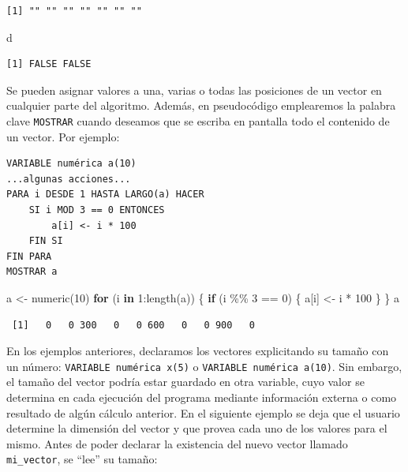 \documentclass[
]{book}
\newenvironment{Shaded}{\begin{snugshade}}{\end{snugshade}}
\newcommand{\ControlFlowTok}[1]{\textcolor[rgb]{0.13,0.29,0.53}{\textbf{#1}}}
\newcommand{\DecValTok}[1]{\textcolor[rgb]{0.00,0.00,0.81}{#1}}
\newcommand{\FunctionTok}[1]{\textcolor[rgb]{0.00,0.00,0.00}{#1}}
\newcommand{\NormalTok}[1]{#1}
\newcommand{\OtherTok}[1]{\textcolor[rgb]{0.56,0.35,0.01}{#1}}
\newcommand{\SpecialCharTok}[1]{\textcolor[rgb]{0.00,0.00,0.00}{#1}}
\begin{document}
\begin{verbatim}
[1] "" "" "" "" "" "" ""
\end{verbatim}

\begin{Shaded}
\begin{Highlighting}[]
\NormalTok{d}
\end{Highlighting}
\end{Shaded}

\begin{verbatim}
[1] FALSE FALSE
\end{verbatim}

Se pueden asignar valores a una, varias o todas las posiciones de un vector en cualquier parte del algoritmo. Además, en pseudocódigo emplearemos la palabra clave \texttt{MOSTRAR} cuando deseamos que se escriba en pantalla todo el contenido de un vector. Por ejemplo:

\begin{verbatim}
VARIABLE numérica a(10)
...algunas acciones...
PARA i DESDE 1 HASTA LARGO(a) HACER
    SI i MOD 3 == 0 ENTONCES  
        a[i] <- i * 100
    FIN SI
FIN PARA
MOSTRAR a
\end{verbatim}

\begin{Shaded}
\begin{Highlighting}[]
\NormalTok{a }\OtherTok{\textless{}{-}} \FunctionTok{numeric}\NormalTok{(}\DecValTok{10}\NormalTok{)}
\ControlFlowTok{for}\NormalTok{ (i }\ControlFlowTok{in} \DecValTok{1}\SpecialCharTok{:}\FunctionTok{length}\NormalTok{(a)) \{}
    \ControlFlowTok{if}\NormalTok{ (i }\SpecialCharTok{\%\%} \DecValTok{3} \SpecialCharTok{==} \DecValTok{0}\NormalTok{) \{}
\NormalTok{        a[i] }\OtherTok{\textless{}{-}}\NormalTok{ i }\SpecialCharTok{*} \DecValTok{100}
\NormalTok{    \}}
\NormalTok{\}}
\NormalTok{a}
\end{Highlighting}
\end{Shaded}

\begin{verbatim}
 [1]   0   0 300   0   0 600   0   0 900   0
\end{verbatim}

En los ejemplos anteriores, declaramos los vectores explicitando su tamaño con un número: \texttt{VARIABLE\ numérica\ x(5)} o \texttt{VARIABLE\ numérica\ a(10)}. Sin embargo, el tamaño del vector podría estar guardado en otra variable, cuyo valor se determina en cada ejecución del programa mediante información externa o como resultado de algún cálculo anterior. En el siguiente ejemplo se deja que el usuario determine la dimensión del vector y que provea cada uno de los valores para el mismo. Antes de poder declarar la existencia del nuevo vector llamado \texttt{mi\_vector}, se ``lee'' su tamaño:
\end{document}
